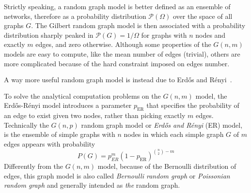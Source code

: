 Strictly speaking, a random graph model is better defined as an ensemble of networks, therefore as a probability distribution $\mathcal{P}(\Omega)$ over the space of all graphs $G$.
The Gilbert random graph model is then associated with a probability distribution sharply peaked in $\mathcal{P}(G)=1/\Omega$ for graphs with $n$ nodes and exactly $m$ edges, and zero otherwise.
Although some properties of the $G(n,m)$ models are easy to compute, like the mean number of edges (trivial), others are more complicated because of the hard constraint imposed on edges number.

A way more useful random graph model is instead due to Erd\H{o}s and Rényi~\cite{erdos1959}.

To solve the analytical computation problems on the $G(n,m)$ model, the Erd\H{o}s-Rényi model introduces a parameter $p_{\textrm{ER}}$ that specifies the probability of an edge to exist given two nodes, rather than picking exactly $m$ edges.
Technically the $G(n,p)$ random graph model or \emph{Erd\H{o}s and Rényi} (ER) model, is the ensemble of simple graphs with $n$ nodes in which each simple graph $G$ of $m$ edges appears with probability
\begin{equation}
P(G)={p}_{ER}^{m}(1-p_{\textrm{ER}})^{\binom{n}{2}-m}
\end{equation}
Differently from the $G(n,m)$ model, because of the Bernoulli distribution of edges, this graph model is also called \emph{Bernoulli random graph} or \emph{Poissonian random graph} and generally intended as \emph{the} random graph.

